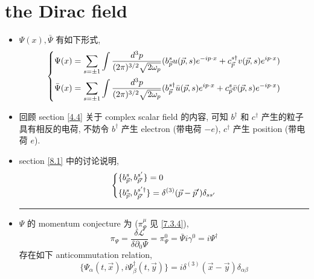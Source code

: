 \section{the Dirac field}
\begin{itemize}
	\item $\Psi(x), \bar{\Psi}$ 有如下形式,
	\begin{equation} \label{8.3.1}
		\begin{dcases}
			\Psi(x) = \sum_{s = \pm 1} \int \frac{d^3 p}{(2 \pi)^{3 / 2} \sqrt{2 \omega_p}} (b^s_{\vec{p}} u(\vec{p}, s) e^{- i p \cdot x} + c^{s \dag}_{\vec{p}} v(\vec{p}, s) e^{i p \cdot x}) \\
			\bar{\Psi}(x) = \sum_{s = \pm 1} \int \frac{d^3 p}{(2 \pi)^{3 / 2} \sqrt{2 \omega_p}} (b^{s \dag}_{\vec{p}} \bar{u}(\vec{p}, s) e^{i p \cdot x} + c^s_{\vec{p}} \bar{v}(\vec{p}, s) e^{- i p \cdot x})
		\end{dcases}
	\end{equation}
	
	\item 回顾 section \ref{4.4} 关于 complex scalar field 的内容, 可知 $b^\dag$ 和 $c^\dag$ 产生的粒子具有相反的电荷, 不妨令 $b^\dag$ 产生 electron (带电荷 $- e$), $c^\dag$ 产生 position (带电荷 $e$).
	
	\item section \ref{8.1} 中的讨论说明,
	\begin{equation} \label{8.3.2}
		\begin{dcases}
			\{b^s_{\vec{p}}, b^{s'}_{\vec{p}'}\} = 0 \\
			\{b^s_{\vec{p}}, b^{s' \dag}_{\vec{p}'}\} = \delta^{(3)}(\vec{p} - \vec{p}') \delta_{s s'}
		\end{dcases}
	\end{equation}
	
	\noindent\rule[0.5ex]{\linewidth}{0.5pt} %
	
	\item $\Psi$ 的 momentum conjecture 为 ($\pi_\Psi^\mu$ 见 \eqref{7.3.4}),
	\begin{equation}
		\pi_\Psi = \frac{\delta \mathcal{L}}{\delta \partial_0 \Psi} = \pi_\Psi^0 = \bar{\Psi} i \gamma^0 = i \Psi^\dag
	\end{equation}
	存在如下 anticommutation relation,
	\begin{equation}
		\{\Psi_\alpha(t, \vec{x}), i \Psi^\dag_\beta(t, \vec{y})\} = i \delta^{(3)}(\vec{x} - \vec{y}) \delta_{\alpha \beta}
	\end{equation}
	

\end{itemize}
